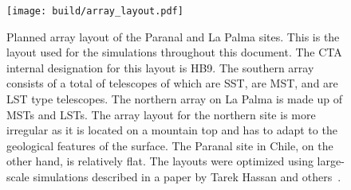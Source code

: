 \begin{figure}
  \centering
  \texttt{[image: build/array\_layout.pdf]}
  \caption[CTA layout at the northern and southern site]{ Planned array layout of the Paranal and La Palma sites. This is the layout used for the simulations throughout this document. 
  The CTA internal designation for this layout is HB9.
  The southern array consists of a total of telescopes of which are SST, are MST, and
  are LST type telescopes. The northern array on La Palma is made up of MSTs  and 
  LSTs. The array layout for the northern site is more irregular as it is located on a mountain top and has to adapt to the geological features of the 
  surface.   
  The Paranal site in Chile, on the other hand, is relatively flat. The layouts were optimized using large-scale simulations described in a paper by Tarek Hassan and others~\cite{cta_layout}.
  }
  \label{fig:cta_layout}
\end{figure}

